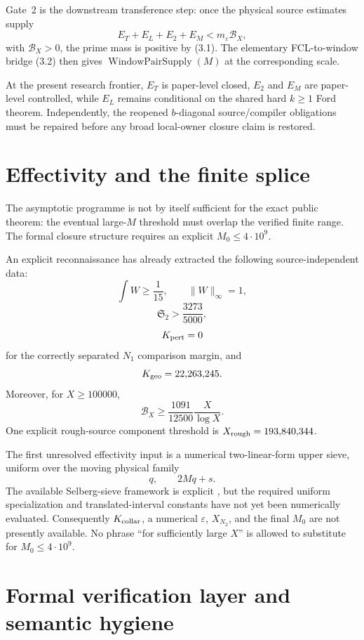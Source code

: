 \documentclass[11pt]{article}
\theoremstyle{definition}
\newcommand{\1}{\mathbf 1}
\newcommand{\BX}{\mathcal B_X}
\newcommand{\WPS}{\operatorname{WindowPairSupply}}
\begin{document}
Gate~2 is the downstream transference step: once the physical source estimates supply
\[
E_T+E_L+E_2+E_M<m_\varepsilon\BX,
\tag{10.1}
\]
with $\BX>0$, the prime mass is positive by (3.1). The elementary FCL-to-window bridge (3.2) then gives $\WPS(M)$ at the corresponding scale.

At the present research frontier, $E_T$ is paper-level closed, $E_2$ and $E_M$ are paper-level controlled, while $E_L$ remains conditional on the shared hard $k\ge1$ Ford theorem. Independently, the reopened $b$-diagonal source/compiler obligations must be repaired before any broad local-owner closure claim is restored.

\section{Effectivity and the finite splice}

The asymptotic programme is not by itself sufficient for the exact public theorem: the eventual large-$M$ threshold must overlap the verified finite range. The formal closure structure requires an explicit $M_0\le4\cdot10^9$.

An explicit reconnaissance has already extracted the following source-independent data:
\[
\int W\ge\frac1{15},\qquad \|W\|_\infty=1,
\]
\[
\mathfrak S_2>\frac{3273}{5000},
\]
\[
K_{\rm pert}=0
\]
for the correctly separated $N_1$ comparison margin, and
\[
K_{\rm geo}=22{,}263{,}245.
\]
Moreover, for $X\ge100000$,
\[
\BX\ge\frac{1091}{12500}\frac{X}{\log X}.
\tag{11.1}
\]
One explicit rough-source component threshold is $X_{\rm rough}=193{,}840{,}344$.

The first unresolved effectivity input is a numerical two-linear-form upper sieve, uniform over the moving physical family
\[
q,\qquad 2Mq+s.
\]
The available Selberg-sieve framework is explicit \cite{BordignonLee2022}, but the required uniform specialization and translated-interval constants have not yet been numerically evaluated. Consequently $K_{\rm collar}$, a numerical $\varepsilon$, $X_{N_2}$, and the final $M_0$ are not presently available. No phrase ``for sufficiently large $X$'' is allowed to substitute for $M_0\le4\cdot10^9$.

\section{Formal verification layer and semantic hygiene}
\end{document}
